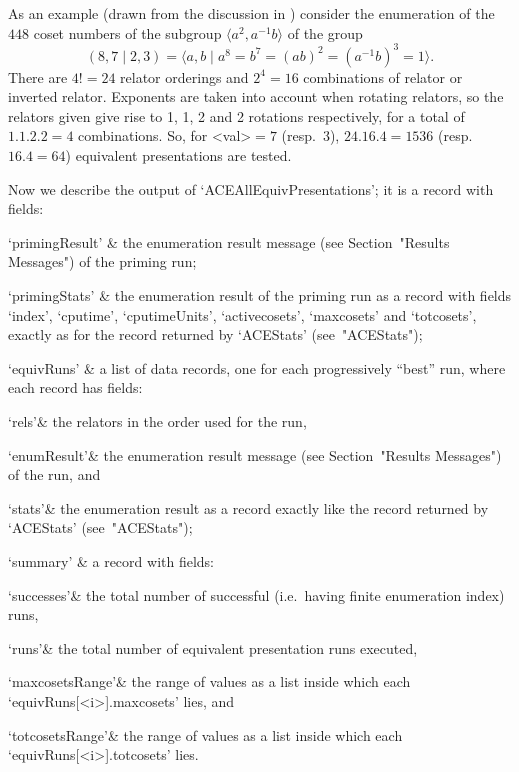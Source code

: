 \endlist

As an example (drawn from the discussion in \cite{HR99ace}) consider the
enumeration   of   the   $448$   coset   numbers   of   the   subgroup
$\langle  a^2,a^{-1}b \rangle$ of the group
$$
(8,7 \mid 2,3) 
    = \langle a,b \mid a^8 = b^7 = (ab)^2 = (a^{-1}b)^3 = 1 \rangle.
$$
There are $4!=24$  relator  orderings  and  $2^4=16$  combinations  of
relator or inverted relator. Exponents are  taken  into  account  when
rotating relators, so the relators given give rise to 1, 1,  2  and  2
rotations respectively, for a total of $1.1.2.2=4$  combinations.  So,
for  <val>${} = 7$   (resp.~$3$),   $24.16.4=1536$   (resp.~$16.4=64$)
equivalent presentations are tested.

Now we describe the output  of  `ACEAllEquivPresentations';  it  is  a
record with fields:

\beginitems

\quad`primingResult' & the  {\ACE}  enumeration  result  message  (see
Section~"Results Messages") of the priming run;

\quad`primingStats' & the enumeration result of the priming run  as  a
{\GAP}  record  with  fields   `index',   `cputime',   `cputimeUnits',
`activecosets', `maxcosets' and `totcosets', exactly as for the record
returned by `ACEStats' (see~"ACEStats");

\quad`equivRuns' & a list of data records, one for each  progressively
``best'' run, where each record has fields:

\qquad`rels'& the relators in the order used for the run,

\qquad`enumResult'&  the  {\ACE}  enumeration  result   message   (see
Section~"Results Messages") of the run, and

\qquad`stats'& the enumeration result as a {\GAP} record exactly  like
the record returned by `ACEStats' (see~"ACEStats");

\quad`summary' & a record with fields:

\qquad`successes'& the total number of successful (i.e.~having  finite
enumeration index) runs,

\qquad`runs'&  the  total  number  of  equivalent  presentation   runs
executed,

\qquad`maxcosetsRange'& the range of values as a  {\GAP}  list  inside
which each `equivRuns[<i>].maxcosets' lies, and

\qquad`totcosetsRange'& the range of values as a  {\GAP}  list  inside
which each `equivRuns[<i>].totcosets' lies.

